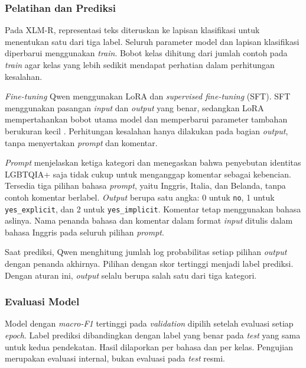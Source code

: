 \documentclass[11pt]{article}
\begin{document}
\subsubsection{Pelatihan dan Prediksi}
Pada XLM-R, representasi teks diteruskan ke lapisan klasifikasi untuk menentukan satu dari tiga label. Seluruh parameter model dan lapisan klasifikasi diperbarui menggunakan \textit{train}. Bobot kelas dihitung dari jumlah contoh pada \textit{train} agar kelas yang lebih sedikit mendapat perhatian dalam perhitungan kesalahan.

\textit{Fine-tuning} Qwen menggunakan LoRA dan \textit{supervised fine-tuning} (SFT). SFT menggunakan pasangan \textit{input} dan \textit{output} yang benar, sedangkan LoRA mempertahankan bobot utama model dan memperbarui parameter tambahan berukuran kecil \citep{hu-etal-2021-lora}. Perhitungan kesalahan hanya dilakukan pada bagian \textit{output}, tanpa menyertakan \textit{prompt} dan komentar.

\textit{Prompt} menjelaskan ketiga kategori dan menegaskan bahwa penyebutan identitas LGBTQIA+ saja tidak cukup untuk menganggap komentar sebagai kebencian. Tersedia tiga pilihan bahasa \textit{prompt}, yaitu Inggris, Italia, dan Belanda, tanpa contoh komentar berlabel. \textit{Output} berupa satu angka: 0 untuk \texttt{no}, 1 untuk \texttt{yes\_explicit}, dan 2 untuk \texttt{yes\_implicit}. Komentar tetap menggunakan bahasa aslinya. Nama penanda bahasa dan komentar dalam format \textit{input} ditulis dalam bahasa Inggris pada seluruh pilihan \textit{prompt}.

Saat prediksi, Qwen menghitung jumlah log probabilitas setiap pilihan \textit{output} dengan penanda akhirnya. Pilihan dengan skor tertinggi menjadi label prediksi. Dengan aturan ini, \textit{output} selalu berupa salah satu dari tiga kategori.

\subsubsection{Evaluasi Model}
Model dengan \textit{macro-F1} tertinggi pada \textit{validation} dipilih setelah evaluasi setiap \textit{epoch}. Label prediksi dibandingkan dengan label yang benar pada \textit{test} yang sama untuk kedua pendekatan. Hasil dilaporkan per bahasa dan per kelas. Pengujian merupakan evaluasi internal, bukan evaluasi pada \textit{test} resmi.
\end{document}
